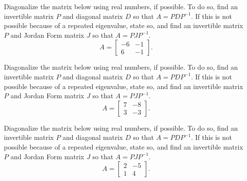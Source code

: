 \documentclass{ximera}
\begin{document}
\begin{exercise}
    Diagonalize the matrix below using real numbers, if possible. To do so, find an invertible matrix $P$ and diagonal matrix $D$ so that $A = PDP^{-1}$. If this is not possible because of a repeated eigenvalue, state so, and find an invertible matrix $P$ and Jordan Form matrix $J$ so that $A = PJP^{-1}$. 
    \[ 
        A = 
        \begin{bmatrix} 
            -6 & -1 \\ 
            6 & -1 
        \end{bmatrix}.
    \]
\end{exercise} 

\begin{exercise}%
    Diagonalize the matrix below using real numbers, if possible. To do so, find an invertible matrix $P$ and diagonal matrix $D$ so that $A = PDP^{-1}$. If this is not possible because of a repeated eigenvalue, state so, and find an invertible matrix $P$ and Jordan Form matrix $J$ so that $A = PJP^{-1}$. 
    \[ 
        A = 
        \begin{bmatrix} 
            7 & -8 \\ 
            3 & -3 
        \end{bmatrix}.
    \]
\end{exercise} 

\begin{exercise}%
    Diagonalize the matrix below using real numbers, if possible. To do so, find an invertible matrix $P$ and diagonal matrix $D$ so that $A = PDP^{-1}$. If this is not possible because of a repeated eigenvalue, state so, and find an invertible matrix $P$ and Jordan Form matrix $J$ so that $A = PJP^{-1}$. 
    \[ 
        A = 
        \begin{bmatrix} 
            2 & -5 \\ 
            1 & 4 
        \end{bmatrix}.
    \]
\end{exercise} 
\end{document}
